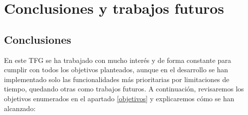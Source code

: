 \chapter{Conclusiones y trabajos futuros}

\section{Conclusiones}

En este TFG se ha trabajado con mucho interés y de forma constante para cumplir con todos los objetivos planteados, aunque en el desarrollo se han implementado solo las funcionalidades más prioritarias por limitaciones de tiempo, quedando otras como trabajos futuros. A continuación, revisaremos los objetivos enumerados en el apartado \ref{objetivos} y explicaremos cómo se han alcanzado:

